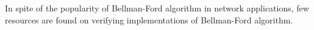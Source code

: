 In spite of the popularity of Bellman-Ford algorithm in network applications, few resources are found on verifying implementations of Bellman-Ford algorithm.

